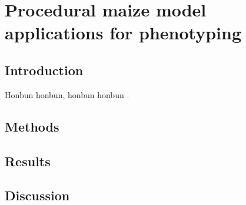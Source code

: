 \chapter{Procedural maize model applications for phenotyping}

\section{Introduction}

Honbun honbun, honbun honbun \citep{zhao_crop_2019}. 


\section{Methods}


\section{Results}

\section{Discussion}